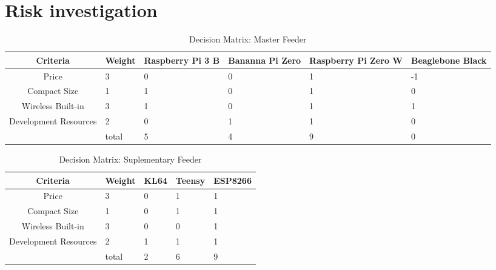 \documentclass[12pt]{article}
\begin{document}
    \section{Risk investigation}

\begin{table}[H]
    \centering
    \caption{Decision Matrix: Master Feeder}
    \label{tab:specs2}
    \begin{tabularx}{\linewidth}{cXXXXX} \toprule
        Criteria & Weight & Raspberry Pi 3 B & Bananna Pi Zero & Raspberry Pi Zero W & Beaglebone Black\\ \midrule
        Price & 3 & 0 & 0  & 1 & -1 \\
        Compact Size & 1 & 1 & 0 & 1 & 0\\
        Wireless Built-in& 3 & 1 & 0 & 1 & 1\\
        Development Resources & 2 & 0 & 1 & 1 & 0\\
        & total & 5 & 4 & 9 & 0
    \end{tabularx}
\end{table}

\begin{table}[H]
    \centering
    \caption{Decision Matrix: Suplementary Feeder}
    \label{tab:specs3}
    \begin{tabularx}{\linewidth}{cXXXX} \toprule
        Criteria & Weight & KL64 & Teensy & ESP8266\\ \midrule
        Price & 3 & 0 & 1 & 1 \\
        Compact Size & 1 & 0 & 1 & 1 \\
        Wireless Built-in& 3 & 0 & 0 & 1 \\
        Development Resources & 2 & 1 & 1 & 1 \\
        & total & 2 & 6 & 9 
    \end{tabularx}
\end{table}

\end{document}

